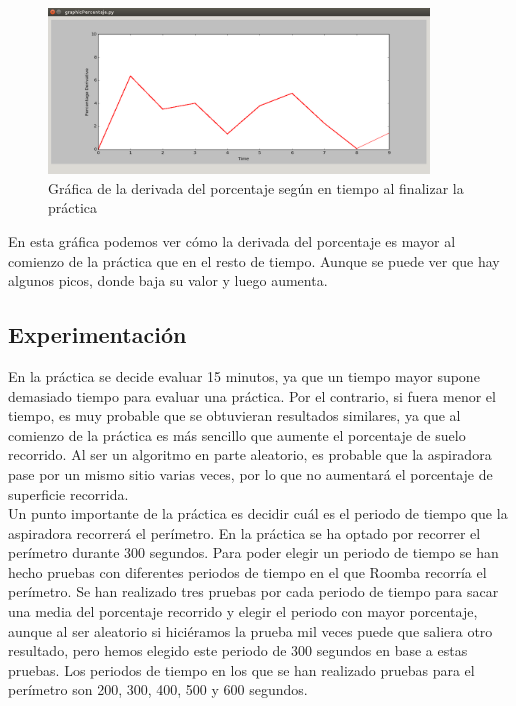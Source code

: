 \begin{figure}[H]
  \begin{center}
    \includegraphics[width=0.9\textwidth]{figures/Vacuum/Porcentaje_Roomba.png}
		\caption{Gráfica de la derivada del porcentaje según en tiempo al finalizar la práctica}
		\label{fig.Porcentaje_Roomba}
		\end{center}
\end{figure}

En esta gráfica podemos ver cómo la derivada del porcentaje es mayor al comienzo de la práctica que en el resto de tiempo. Aunque se puede ver que hay algunos picos, donde baja su valor y luego aumenta.\\

\subsection{Experimentación}
En la práctica se decide evaluar 15 minutos, ya que un tiempo mayor supone demasiado tiempo para evaluar una práctica. Por el contrario, si fuera menor el tiempo, es muy probable que se obtuvieran resultados similares, ya que al comienzo de la práctica es más sencillo que aumente el porcentaje de suelo recorrido. Al ser un algoritmo en parte aleatorio, es probable que la aspiradora pase por un mismo sitio varias veces, por lo que no aumentará el porcentaje de superficie recorrida.\\

Un punto importante de la práctica es decidir cuál es el periodo de tiempo que la aspiradora recorrerá el perímetro. En la práctica se ha optado por recorrer el perímetro durante 300 segundos. Para poder elegir un periodo de tiempo se han hecho pruebas con diferentes periodos de tiempo en el que Roomba recorría el perímetro. Se han realizado tres pruebas por cada periodo de tiempo para sacar una media del porcentaje recorrido y elegir el periodo con mayor porcentaje, aunque al ser aleatorio si hiciéramos la prueba mil veces puede que saliera otro resultado, pero hemos elegido este periodo de 300 segundos en base a estas pruebas. Los periodos de tiempo en los que se han realizado pruebas para el perímetro son 200, 300, 400, 500 y 600 segundos.\\

